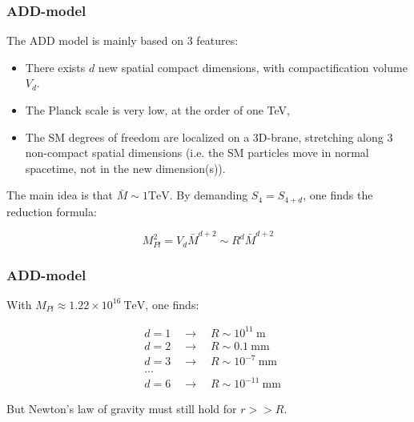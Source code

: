 \documentclass[10pt]{beamer}
\begin{document}
	\begin{frame}
		\frametitle{ADD-model}
		The ADD model is mainly based on 3 features:
		
		\begin{itemize}
			\item There exists $d$ new spatial compact dimensions, with compactification volume $V_d$.
			\item The Planck scale is very low, at the order of one TeV,
			\item The SM degrees of freedom are localized on a 3D-brane, stretching along 3 non-compact spatial dimensions (i.e. the SM particles move in normal spacetime, not in the new dimension(s)).
		\end{itemize}
		
		The main idea is that $\bar{M} \sim 1\text{TeV}$.
		By demanding $S_4=S_{4+d}$, one finds the reduction formula:
		
		\begin{equation}
			M_{Pl}^2 = V_d \bar{M}^{d+2} \sim R^d \bar{M}^{d+2}
		\end{equation}
	\end{frame}
	
	\begin{frame}
		\frametitle{ADD-model}
		With $M_{Pl} \approx 1.22\times 10^{16}\:\text{TeV}$, one finds:
		
		\begin{align*}
		&d=1\quad\rightarrow\quad R\sim 10^{11}\:\text{m}\\
		&d=2\quad\rightarrow\quad R\sim 0.1\:\text{mm}\\
		&d=3\quad\rightarrow\quad R\sim 10^{-7}\:\text{mm}\\
		&\ldots\\
		&d=6\quad\rightarrow\quad R\sim 10^{-11}\:\text{mm}
		\end{align*}
		
		But Newton's law of gravity must still hold for $r>>R$.
	\end{frame}
	
\end{document}
